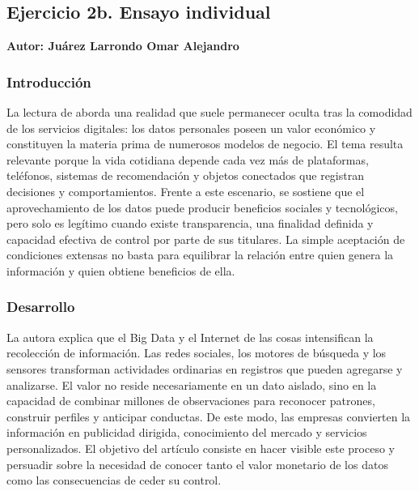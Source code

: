 
\newpage
\subsection*{Ejercicio 2b. Ensayo individual}

\begin{flushright}
\textbf{Autor: Juárez Larrondo Omar Alejandro}
\end{flushright}

\subsubsection*{Introducción}

La lectura de \citet{datavalue} aborda una realidad que suele permanecer oculta
tras la comodidad de los servicios digitales: los datos personales poseen un
valor económico y constituyen la materia prima de numerosos modelos de negocio.
El tema resulta relevante porque la vida cotidiana depende cada vez más de
plataformas, teléfonos, sistemas de recomendación y objetos conectados que
registran decisiones y comportamientos. Frente a este escenario, se sostiene
que el aprovechamiento de los datos puede producir beneficios sociales y
tecnológicos, pero solo es legítimo cuando existe transparencia, una finalidad
definida y capacidad efectiva de control por parte de sus titulares. La simple
aceptación de condiciones extensas no basta para equilibrar la relación entre
quien genera la información y quien obtiene beneficios de ella.

\subsubsection*{Desarrollo}

La autora explica que el Big Data y el Internet de las cosas intensifican la
recolección de información. Las redes sociales, los motores de búsqueda y los
sensores transforman actividades ordinarias en registros que pueden agregarse
y analizarse. El valor no reside necesariamente en un dato aislado, sino en la
capacidad de combinar millones de observaciones para reconocer patrones,
construir perfiles y anticipar conductas. De este modo, las empresas convierten
la información en publicidad dirigida, conocimiento del mercado y servicios
personalizados. El objetivo del artículo consiste en hacer visible este proceso
y persuadir sobre la necesidad de conocer tanto el valor monetario de los datos
como las consecuencias de ceder su control.

